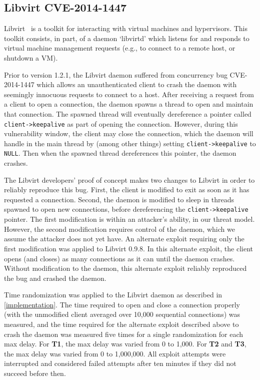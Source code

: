 \subsection{Libvirt CVE-2014-1447}
Libvirt~\cite{libvirt} is a toolkit for interacting with virtual machines and hypervisors.
This toolkit consists, in part, of a daemon `libvirtd' which listens for and
responds to virtual machine management requests (e.g., to connect to a remote host, or shutdown a VM).

Prior to version 1.2.1, the Libvirt daemon suffered from concurrency bug CVE-2014-1447 which allows an unauthenticated client to crash the daemon with seemingly innocuous requests to connect to a host.
After receiving a request from a client to open a connection, the daemon spawns a thread to open and maintain that connection.
The spawned thread will eventually dereference a pointer called
\texttt{client->keepalive} as part of opening the connection.
However, during this vulnerability window, the client may close the
connection, which the daemon will handle in the main thread by (among other
things) setting \texttt{client->keepalive} to \texttt{NULL}.
Then when the spawned thread dereferences this pointer, the daemon crashes.~\cite{RHELbug1047577}

The Libvirt developers' proof of concept makes two changes to Libvirt in order to reliably reproduce this bug.
First, the client is modified to exit as soon as it has requested a connection.
Second, the daemon is modified to sleep in threads spawned to open new
connections, before dereferencing the \texttt{client->keepalive} pointer.
The first modification is within an attacker's ability, in our threat model.
However, the second modification requires control of the daemon, which we assume the attacker does not yet have.
An alternate exploit requiring only the first modification was applied to Libvirt 0.9.8.
In this alternate exploit, the client opens (and closes) as many connections as it can until the daemon crashes.
Without modification to the daemon, this alternate exploit reliably reproduced the bug and crashed the daemon.

Time randomization was applied to the Libvirt daemon as described in \autoref{implementation}.
The time required to open and close a connection properly (with the unmodified client averaged over 10,000 sequential connections) was measured, and the time required for the alternate exploit described above to crash the daemon was measured five times for a single randomization for each max delay.
For \textbf{T1}, the max delay was varied from 0 to 1,000.
For \textbf{T2} and \textbf{T3}, the max delay was varied from 0 to 1,000,000.
All exploit attempts were interrupted and considered failed attempts after ten minutes if they did not succeed before then.
